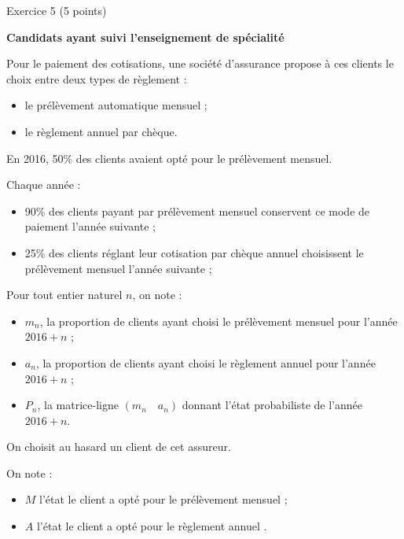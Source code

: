 
%
\begin{h2}Exercice 5 (5 points)\end{h2}
\par
\textbf{Candidats ayant suivi l'enseignement de spécialité}
\par
Pour le paiement des cotisations, une société d'assurance propose à ces clients le choix entre deux types de règlement :
\par
\begin{itemize}
     \item
     le prélèvement automatique mensuel ;
     \item
     le règlement annuel par chèque.
\end{itemize}
\par
En 2016, 50\% des clients avaient opté pour le prélèvement mensuel.
\par
Chaque année :
\begin{itemize}
     \item
     90\% des clients payant par prélèvement mensuel conservent ce mode de paiement l'année suivante ;
     \item
     25\% des clients réglant leur cotisation par chèque annuel choisissent le prélèvement mensuel l'année suivante ;
\end{itemize}
\vspace{0.2cm}
\par
Pour tout entier naturel $n$, on note :
\begin{itemize}
     \item
     $m_{n}$, la proportion de clients ayant choisi le prélèvement mensuel pour l'année $2016 + n$ ;
     \item
     $a_{n}$, la proportion de clients ayant choisi le règlement annuel pour l'année $2016 + n$ ;
     \item
     $P_{n}$, la matrice-ligne $\left(m_{n} \quad a_{n}\right)$ donnant l'état probabiliste de l'année $2016 + n$.
\end{itemize}
\par
On choisit au hasard un client de cet assureur.
\par
On note :
\begin{itemize}
     \item %
     $M$ l'état \og le client a opté pour le prélèvement mensuel \fg{} ;
     \item %
     $A$ l'état \og le client a opté pour le règlement annuel \fg{} .
\end{itemize}
